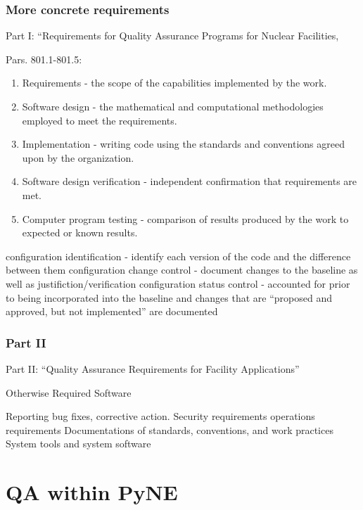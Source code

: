 \documentclass[12pt]{beamer}
\begin{document}
\begin{frame}
\frametitle{More concrete requirements}

Part I: “Requirements for Quality Assurance Programs for
Nuclear Facilities,

Pars. 801.1-801.5:
\begin{enumerate}
\item{Requirements - the scope of the capabilities implemented by the work.}
\item{Software design - the mathematical and computational methodologies employed to meet the requirements.}
\item{Implementation - writing code using the standards and conventions agreed upon by the organization.}
\item{Software design verification - independent confirmation that requirements are met.}
\item{Computer program testing - comparison of results produced by the work to expected or known results.}
\end{enumerate}

configuration identification - identify each version of the code and the difference between them
configuration change control - document changes to the baseline as well as justifiction/verification
configuration status control - accounted for prior to being incorporated into the baseline and changes that are “proposed and approved, but not implemented” are documented \cite{add}

\end{frame}

\begin{frame}
\frametitle{Part II}
Part II: “Quality Assurance Requirements for Facility Applications”

Otherwise Required Software

Reporting bug fixes, corrective action.
Security requirements
operations requirements
Documentations of standards, conventions, and work practices
System tools and system software


\end{frame}



\section{QA within PyNE}
\end{document}
